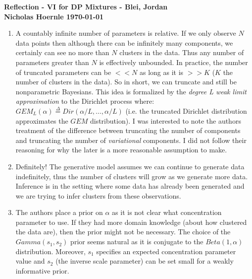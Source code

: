 \documentclass[twoside]{article}
\begin{document}
\textbf{Reflection - VI for DP Mixtures - Blei, Jordan}\\
\textbf{Nicholas Hoernle \hfill \today}

\begin{enumerate}
  \item A countably infinite number of parameters is relative. If we only observe $N$ data points then although there can be infinitely many components, we certainly can see no more than $N$ clusters in the data. Thus any number of parameters greater than $N$ is effectively unbounded. In practice, the number of truncated parameters can be $<<N$ as long as it is $>>K$ ($K$ the number of clusters in the data). So in short, we can truncate and still be nonparametric Bayesians. This idea is formalized by the \textit{degree L weak limit approximation} to the Dirichlet process where: $GEM_L(\alpha) \overset{\Delta}{=} Dir(\alpha/L, \hdots, \alpha/L)$ (i.e. the truncated Dirichlet distribution approximates the $GEM$ distribution). I was interested to note the authors treatment of the difference between truncating the number of components and truncating the number of \textit{variational} components. I did not follow their reasoning for why the later is a more reasonable assumption to make.
  \item Definitely! The generative model assumes we can continue to generate data indefinitely, thus the number of clusters will grow as we generate more data. Inference is in the setting where some data has already been generated and we are trying to infer clusters from these observations.
  \item The authors place a prior on $\alpha$ as it is not clear what concentration parameter to use. If they had more domain knowledge (about how clustered the data are), then the prior might not be necessary. The choice of the $Gamma(s_1, s_2)$ prior seems natural as it is conjugate to the $Beta(1, \alpha)$ distribution. Moreover, $s_1$ specifies an expected concentration parameter value and $s_2$ (the inverse scale parameter) can be set small for a weakly informative prior.
\end{enumerate}


% 
\end{document}
